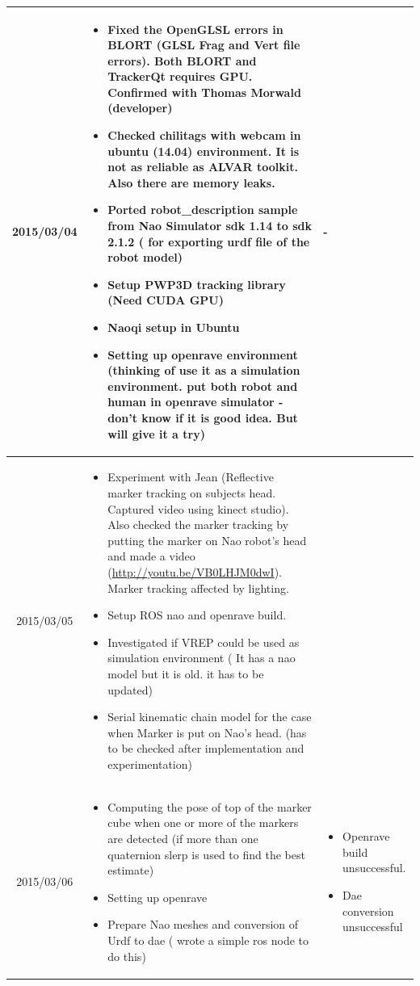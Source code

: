 \documentclass[11pt]{article} %
\begin{document}
\begin{center}
\begin{longtable}{ | c | p{6cm} | p{5cm} |}
  
  2015/03/04        & 
  \begin{itemize}
  \item Fixed the OpenGLSL errors in BLORT (GLSL Frag and Vert file errors). Both BLORT and TrackerQt requires GPU. Confirmed with Thomas Morwald (developer)
  \item Checked chilitags with webcam in ubuntu (14.04) environment. It is not as reliable as ALVAR toolkit. Also there are memory leaks.
  \item Ported robot\_description sample from Nao Simulator sdk 1.14 to sdk 2.1.2 ( for exporting urdf file of the robot model)
  \item Setup PWP3D tracking library (Need CUDA GPU)
  \item Naoqi setup in Ubuntu
  \item Setting up openrave environment (thinking of use it as a simulation environment. put both robot and human in openrave simulator - don't know if it is good idea. But will give it a try)
\end{itemize}   
  										 & - \\
  \hline
  
  2015/03/05         & 
  \begin{itemize}
  \item Experiment with Jean (Reflective marker tracking on subjects head. Captured video using kinect studio). Also checked the marker tracking by putting the marker on Nao robot's head and made a video (\url{http://youtu.be/VB0LHJM0dwI}). Marker tracking affected by lighting. 
  \item Setup ROS nao and openrave build.
  \item Investigated if VREP could be used as simulation environment ( It has a nao model but it is old. it has to be updated)
  \item Serial kinematic chain model for the case when Marker is put on Nao's head.  (has to be checked after implementation and experimentation)
\end{itemize}   
  & 
\\  										 \hline

  2015/03/06         & 
  \begin{itemize}
  \item Computing the pose of top of the marker cube when one or more of the markers are detected (if more than one quaternion slerp is used to find the best estimate)
  \item Setting up openrave
  \item Prepare Nao meshes and conversion of Urdf to dae ( wrote a simple ros node to do this)
\end{itemize}   
  & 
  \begin{itemize}
  										 \item Openrave build unsuccessful. 
  										 \item Dae conversion unsuccessful
  										 \end{itemize} \\
  										 \hline
  										 

\end{longtable}
\end{center}
\end{document}
